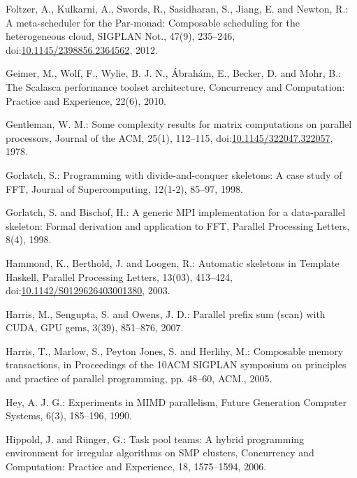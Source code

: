 \documentclass[paper=A4,twoside=true,openright,parskip=full,chapterprefix=true,headings=normal,bibliography=totoc,listof=totoc,titlepage=on,captions=tableabove,draft=false,british]{scrreprt}%
\begin{document}
\leavevmode\hypertarget{ref-Foltzer:2012:MPC:2398856.2364562}{}%
Foltzer, A., Kulkarni, A., Swords, R., Sasidharan, S., Jiang, E. and
Newton, R.: A meta-scheduler for the Par-monad: Composable scheduling
for the heterogeneous cloud, SIGPLAN Not., 47(9), 235--246,
doi:\href{https://doi.org/10.1145/2398856.2364562}{10.1145/2398856.2364562},
2012.

\leavevmode\hypertarget{ref-Geimer2010}{}%
Geimer, M., Wolf, F., Wylie, B. J. N., Ábrahám, E., Becker, D. and Mohr,
B.: The Scalasca performance toolset architecture, Concurrency and
Computation: Practice and Experience, 22(6), 2010.

\leavevmode\hypertarget{ref-Gentleman1978}{}%
Gentleman, W. M.: Some complexity results for matrix computations on
parallel processors, Journal of the ACM, 25(1), 112--115,
doi:\href{https://doi.org/10.1145/322047.322057}{10.1145/322047.322057},
1978.

\leavevmode\hypertarget{ref-Gorlatch1998}{}%
Gorlatch, S.: Programming with divide-and-conquer skeletons: A case
study of FFT, Journal of Supercomputing, 12(1-2), 85--97, 1998.

\leavevmode\hypertarget{ref-Gorlatch}{}%
Gorlatch, S. and Bischof, H.: A generic MPI implementation for a
data-parallel skeleton: Formal derivation and application to FFT,
Parallel Processing Letters, 8(4), 1998.

\leavevmode\hypertarget{ref-doi:10.1142ux2fS0129626403001380}{}%
Hammond, K., Berthold, J. and Loogen, R.: Automatic skeletons in
Template Haskell, Parallel Processing Letters, 13(03), 413--424,
doi:\href{https://doi.org/10.1142/S0129626403001380}{10.1142/S0129626403001380},
2003.

\leavevmode\hypertarget{ref-harris2007parallel}{}%
Harris, M., Sengupta, S. and Owens, J. D.: Parallel prefix sum (scan)
with CUDA, GPU gems, 3(39), 851--876, 2007.

\leavevmode\hypertarget{ref-Harris:2005:CMT:1065944.1065952}{}%
Harris, T., Marlow, S., Peyton Jones, S. and Herlihy, M.: Composable
memory transactions, in Proceedings of the 10ACM SIGPLAN symposium on
principles and practice of parallel programming, pp. 48--60, ACM., 2005.

\leavevmode\hypertarget{ref-Hey1990185}{}%
Hey, A. J. G.: Experiments in MIMD parallelism, Future Generation
Computer Systems, 6(3), 185--196, 1990.

\leavevmode\hypertarget{ref-Hippold2006}{}%
Hippold, J. and Rünger, G.: Task pool teams: A hybrid programming
environment for irregular algorithms on SMP clusters, Concurrency and
Computation: Practice and Experience, 18, 1575--1594, 2006.
\end{document}
